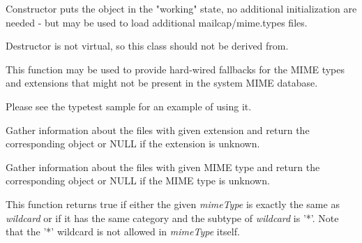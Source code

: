\label{wxmimetypesmanagerctor}


Constructor puts the object in the "working" state, no additional initialization
are needed - but  may be used to load
additional mailcap/mime.types files.

\label{wxmimetypesmanagerdtor}


Destructor is not virtual, so this class should not be derived from.

\label{wxmimetypesmanageraddfallbacks}


This function may be used to provide hard-wired fallbacks for the MIME types
and extensions that might not be present in the system MIME database.


Please see the typetest sample for an example of using it.

\label{wxmimetypesmanagergetfiletypefromextension}


Gather information about the files with given extension and return the
corresponding  object or NULL if the extension
is unknown.

\label{wxmimetypesmanagergetfiletypefrommimetype}


Gather information about the files with given MIME type and return the
corresponding  object or NULL if the MIME type
is unknown.

\label{wxmimetypesmanagerisoftype}


This function returns true if either the given {\it mimeType} is exactly the
same as {\it wildcard} or if it has the same category and the subtype of
{\it wildcard} is '*'. Note that the '*' wildcard is not allowed in
{\it mimeType} itself.

